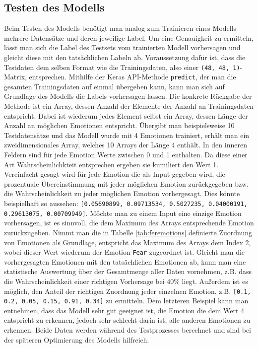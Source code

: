 \documentclass[12pt, a4paper]{report}
\begin{document}
\subsection{Testen des Modells}
Beim Testen des Modells benötigt man analog zum Trainieren eines Modells mehrere Datensätze und deren jeweilige Label. Um eine Genauigkeit zu ermitteln, lässt man sich die Label des Testsets vom trainierten Modell vorhersagen und gleicht diese mit den tatsächlichen Labeln ab. Voraussetzung dafür ist, dass die Testdaten dem selben Format wie die Trainingsdaten, also einer \texttt{(48, 48, 1)}-Matrix, entsprechen. Mithilfe der Keras API-Methode \texttt{predict}, der man die gesamten Trainingsdaten auf einmal übergeben kann, kann man sich auf Grundlage des Modells die Labels vorhersagen lassen. Die konkrete Rückgabe der Methode ist ein Array, dessen Anzahl der Elemente der Anzahl an Trainingsdaten entspricht. Dabei ist wiederum jedes Element selbst ein Array, dessen Länge der Anzahl an möglichen Emotionen entspricht. Übergibt man beispielsweise 10 Testdatensätze und das Modell wurde mit 4 Emotionen trainiert, erhält man ein zweidimensionales Array, welches 10 Arrays der Länge 4 enthält. In den inneren Feldern sind für jede Emotion Werte zwischen 0 und 1 enthalten. Da diese einer Art Wahrscheinlichkteit entsprechen ergeben sie kumiliert den Wert 1. Vereinfacht gesagt wird für jede Emotion die als Input gegeben wird, die prozentuale Übereinstimmung mit jeder möglichen Emotion zurückgegeben bzw. die Wahrscheinlichkeit zu jeder möglichen Emotion vorhergesagt. Dies könnte beispielhaft so aussehen: \texttt{[0.05690899, 0.09713534, 0.5027235,  0.04000191, 0.29613075, 0.00709949]}. Möchte man zu einem Input eine einzige Emotion vorhersagen, ist es sinnvoll, die dem Maximum des Arrays entsprechende Emotion zurückzugeben. Nimmt man die in Tabelle \ref{tab:feremotions} definierte Zuordnung von Emotionen als Grundlage, entspricht das Maximum des Arrays dem Index 2, wobei dieser Wert wiederum der Emotion \texttt{Fear} zugeordnet ist.\newline
Gleicht man die vorhergesagten Emotionen mit den tatsächlichen Emotionen ab, kann man eine statistische Auswertung über der Gesamtmenge aller Daten vornehmen, z.B. dass die Wahrscheinlichkeit einer richtigen Vorhersage bei 40\% liegt. Außerdem ist es möglich, den Anteil der richtigen Zuordnung jeder einzelnen Emotion, z.B. \texttt{[0.1, 0.2, 0.05, 0.15, 0.91, 0.34]} zu ermitteln. Dem letzteren Beispiel kann man entnehmen, dass das Modell sehr gut geeignet ist, die Emotion die dem Wert 4 entspricht zu erkennen, jedoch sehr schlecht darin ist, alle anderen Emotionen zu erkennen. Beide Daten werden während des Testprozesses berechnet und sind bei der späteren Optimierung des Modells hilfreich.
\end{document}
